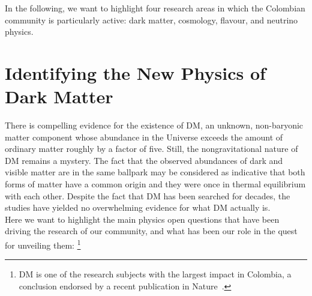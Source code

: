 \documentclass[a4paper,11pt]{article}
\begin{document}
\noindent
In the following, we want to highlight four research areas in which the Colombian community is particularly active: dark matter, cosmology, flavour, and neutrino physics.\\

\section{Identifying the New Physics of Dark Matter}
There is compelling evidence for the existence of DM, an unknown, non-baryonic matter component whose abundance in the Universe exceeds the amount of ordinary matter roughly by a factor of five. Still, the nongravitational nature of DM remains a mystery. The fact that the observed abundances of dark and visible matter are in the same ballpark may be considered as indicative that both forms of matter have a common origin and they were once in thermal equilibrium with each other. Despite the fact that DM has been searched for decades, the studies have yielded no overwhelming evidence for what DM actually is.\\

Here we want to highlight the main physics open questions that have been driving the research of our community, and what has been our role in the quest for unveiling them:%
\footnote{DM is one of the research subjects with the largest impact in Colombia, a conclusion endorsed by a recent publication in Nature~\cite{Bajak2018}.}
\end{document}
